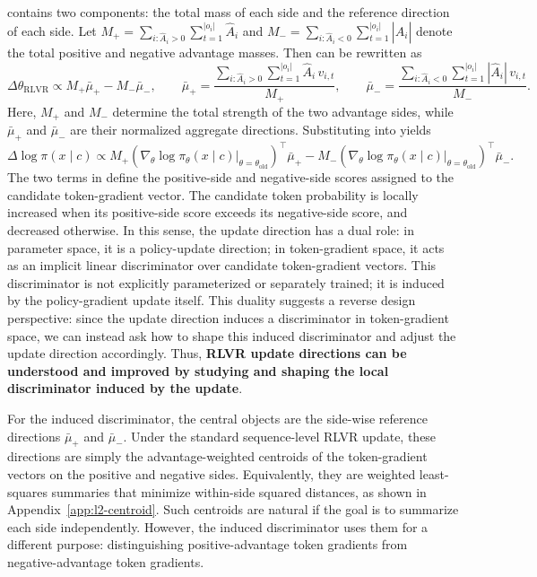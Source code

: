 \documentclass{article} %
\begin{document}
 contains two components: the total mass of each side and the reference direction of each side. 
Let \(M_+=\sum_{i:\hat A_i>0}\sum_{t=1}^{|o_i|}\hat A_i\) and \(M_-=\sum_{i:\hat A_i<0}\sum_{t=1}^{|o_i|}|\hat A_i|\) denote the total positive and negative advantage masses. 
Then  can be rewritten as
\begin{equation}
\label{eq:centroid-decomposition}
\Delta\theta_{\mathrm{RLVR}}
\propto
M_+\bar\mu_+ - M_-\bar\mu_-,
\qquad
\bar\mu_+
=
\frac{
\sum_{i:\hat A_i>0}\sum_{t=1}^{|o_i|}
\hat A_i\,v_{i,t}
}{
M_+
},
\qquad
\bar\mu_-
=
\frac{
\sum_{i:\hat A_i<0}\sum_{t=1}^{|o_i|}
|\hat A_i|\,v_{i,t}
}{
M_-
}.
\end{equation}
Here, \(M_+\) and \(M_-\) determine the total strength of the two advantage sides, while \(\bar\mu_+\) and \(\bar\mu_-\) are their normalized aggregate directions. 
Substituting  into  yields
\begin{equation}
\label{eq:local-discriminator-score}
\Delta \log \pi(x\mid c)
\propto
M_+
\left(
\nabla_\theta \log \pi_\theta(x\mid c)
\Big|_{\theta=\theta_{\mathrm{old}}}
\right)^{\top}
\bar\mu_+
-
M_-
\left(
\nabla_\theta \log \pi_\theta(x\mid c)
\Big|_{\theta=\theta_{\mathrm{old}}}
\right)^{\top}
\bar\mu_- .
\end{equation}
The two terms in  define the positive-side and negative-side scores assigned to the candidate token-gradient vector. 
The candidate token probability is locally increased when its positive-side score exceeds its negative-side score, and decreased otherwise. 
In this sense, the update direction has a dual role: in parameter space, it is a policy-update direction; in token-gradient space, it acts as an implicit linear discriminator over candidate token-gradient vectors. 
This discriminator is not explicitly parameterized or separately trained; it is induced by the policy-gradient update itself. 
This duality suggests a reverse design perspective: since the update direction induces a discriminator in token-gradient space, we can instead ask how to shape this induced discriminator and adjust the update direction accordingly. 
Thus, \textbf{RLVR update directions can be understood and improved by studying and shaping the local discriminator induced by the update}.

For the induced discriminator, the central objects are the side-wise reference directions \(\bar\mu_+\) and \(\bar\mu_-\). 
Under the standard sequence-level RLVR update, these directions are simply the advantage-weighted centroids of the token-gradient vectors on the positive and negative sides. 
Equivalently, they are weighted least-squares summaries that minimize within-side squared distances, as shown in Appendix~\ref{app:l2-centroid}. 
Such centroids are natural if the goal is to summarize each side independently. 
However, the induced discriminator uses them for a different purpose: distinguishing positive-advantage token gradients from negative-advantage token gradients.
\end{document}
